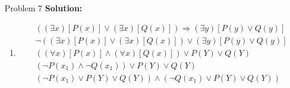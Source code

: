 \normalfont\documentclass[letterpaper,11pt]{article}
\begin{document}
\begin{enumerate}
\item[Problem 7]\textbf{Solution:}\par
\begin{enumerate}
	\item 
	\begin{eqnarray*}
		&&((\exists x)[P(x)] \lor (\exists x)[Q(x)])\Rightarrow (\exists y)[P(y) \lor Q(y)]\\
		&&\neg ((\exists x)[P(x)] \lor (\exists x)[Q(x)]) \lor (\exists y)[P(y) \lor Q(y)]\\
		&&((\forall x)[P(x)] \land (\forall x)[Q(x)]) \lor P(Y) \lor Q(Y)\\
		&&(\neg P(x_1)\land \neg Q(x_1)) \lor P(Y) \lor Q(Y)\\
		&&(\neg P(x_1)\lor P(Y) \lor Q(Y)) \land (\neg Q(x_1) \lor P(Y) \lor Q(Y))
	\end{eqnarray*}


\end{enumerate}
\end{enumerate}
\end{document}

